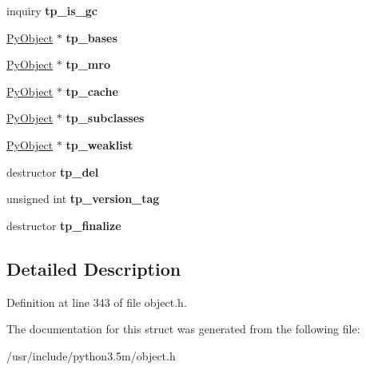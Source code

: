 \begin{DoxyCompactItemize}
\item 
inquiry {\bfseries tp\+\_\+is\+\_\+gc}\hypertarget{struct__typeobject_adef285ef9efe163de1c57925451f2b5c}{}\label{struct__typeobject_adef285ef9efe163de1c57925451f2b5c}

\item 
\hyperlink{struct__object}{Py\+Object} $\ast$ {\bfseries tp\+\_\+bases}\hypertarget{struct__typeobject_ac261b8254c5dc6679c5359cc262a9762}{}\label{struct__typeobject_ac261b8254c5dc6679c5359cc262a9762}

\item 
\hyperlink{struct__object}{Py\+Object} $\ast$ {\bfseries tp\+\_\+mro}\hypertarget{struct__typeobject_ad63f55aa467a1b1ef34dd84a4661d294}{}\label{struct__typeobject_ad63f55aa467a1b1ef34dd84a4661d294}

\item 
\hyperlink{struct__object}{Py\+Object} $\ast$ {\bfseries tp\+\_\+cache}\hypertarget{struct__typeobject_abd86b6931d70d6edf700bb7172ca5543}{}\label{struct__typeobject_abd86b6931d70d6edf700bb7172ca5543}

\item 
\hyperlink{struct__object}{Py\+Object} $\ast$ {\bfseries tp\+\_\+subclasses}\hypertarget{struct__typeobject_acae460bf5a2aa21095f31534d95d88e4}{}\label{struct__typeobject_acae460bf5a2aa21095f31534d95d88e4}

\item 
\hyperlink{struct__object}{Py\+Object} $\ast$ {\bfseries tp\+\_\+weaklist}\hypertarget{struct__typeobject_aeb30a09b1547d3ee33eba050b34f28b6}{}\label{struct__typeobject_aeb30a09b1547d3ee33eba050b34f28b6}

\item 
destructor {\bfseries tp\+\_\+del}\hypertarget{struct__typeobject_aff367b8344e94586326576ec274b625d}{}\label{struct__typeobject_aff367b8344e94586326576ec274b625d}

\item 
unsigned int {\bfseries tp\+\_\+version\+\_\+tag}\hypertarget{struct__typeobject_a20cd8f5be5b4df827007c6a76112531f}{}\label{struct__typeobject_a20cd8f5be5b4df827007c6a76112531f}

\item 
destructor {\bfseries tp\+\_\+finalize}\hypertarget{struct__typeobject_ac7a48087ec9f8101af2aadef3485b688}{}\label{struct__typeobject_ac7a48087ec9f8101af2aadef3485b688}

\end{DoxyCompactItemize}


\subsection{Detailed Description}


Definition at line 343 of file object.\+h.



The documentation for this struct was generated from the following file\+:\begin{DoxyCompactItemize}
\item 
/usr/include/python3.\+5m/object.\+h\end{DoxyCompactItemize}
